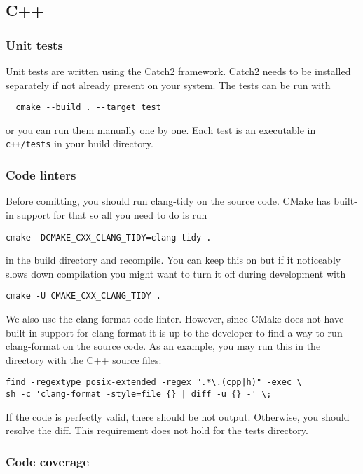 \documentclass{article}
\begin{document}
\subsection{C++}

\subsubsection{Unit tests}

Unit tests are written using the Catch2 framework. Catch2 needs to be installed separately if not already present on your system. The tests can be run with
\begin{verbatim}
  cmake --build . --target test
\end{verbatim}
or you can run them manually one by one. Each test is an executable in \texttt{c++/tests} in your build directory.

\subsubsection{Code linters}

Before comitting, you should run clang-tidy on the source code. CMake has built-in support for that so all you need to do is run
\begin{verbatim}
cmake -DCMAKE_CXX_CLANG_TIDY=clang-tidy .
\end{verbatim}
in the build directory and recompile. You can keep this on but if it noticeably slows down compilation you might want to turn it off during development with
\begin{verbatim}
cmake -U CMAKE_CXX_CLANG_TIDY .
\end{verbatim}
We also use the clang-format code linter. However, since CMake does not have built-in support for clang-format it is up to the developer to find a way to run clang-format on the source code. As an example, you may run this in the directory with the C++ source files:
\begin{verbatim}
find -regextype posix-extended -regex ".*\.(cpp|h)" -exec \
sh -c 'clang-format -style=file {} | diff -u {} -' \;
\end{verbatim}
If the code is perfectly valid, there should be not output. Otherwise, you should resolve the diff. This requirement does not hold for the tests directory.

\subsubsection{Code coverage}
\end{document}
